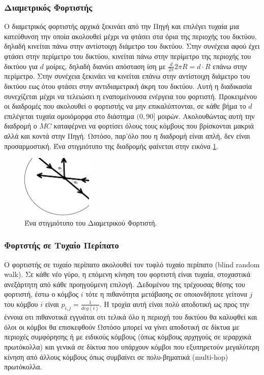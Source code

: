 \subsubsection{Διαμετρικός Φορτιστής}
Ο διαμετρικός φορτιστής αρχικά ξεκινάει από την Πηγή και επιλέγει τυχαία μια κατεύθυνση την οποία ακολουθεί μέχρι να φτάσει στα όρια της περιοχής του δικτύου, δηλαδή
κινείται πάνω στην αντίστοιχη διάμετρο του δικτύου. Στην συνέχεια αφού έχει φτάσει στην περίμετρο του δικτύου, κινείται πάνω στην περίμετρο της περιοχής του δικτύου
για $d$ μοίρες, δηλαδή διανύει απόσταση ίση με $\frac{d}{2\pi}2\pi R = d\cdot R$ επάνω στην περίμετρο. Στην συνέχεια ξεκινάει να κινείται επάνω στην αντίστοιχη
διάμετρο του δικτύου εως ότου φτάσει στην αντιδιαμετρική άκρη του δικτύου. Αυτή η διαδικασία συνεχίζεται μέχρι να τελειώσει η εναπομείνουσα ενέργεια του φορτιστή.
Προκειμένου οι διαδρομές που ακολουθεί ο φορτιστής να μην επικαλύπτονται, σε κάθε βήμα το $d$ επιλέγεται τυχαία ομοιόμορφα στο διάστημα $(0,90]$ μοιρών. Ακολουθώντας
αυτή την διαδρομή ο $MC$ καταφέρνει να φορτίσει όλους τους κόμβους που βρίσκονται μακριά αλλά και κοντά στην Πηγή. Ωστόσο, παρ'όλο που η διαδρομή είναι απλή, δεν
είναι προσαρμοστική. Ένα στιγμιότυπο της διαδρομής φαίνεται στην εικόνα \ref{fig:diameter_charger}.
\vspace{0.9cm}
\begin{figure}[h]
	\centering
	\includegraphics[width=0.3\textwidth]{images/diameter.eps}
	\caption{Ένα στιγμιότυπο του Διαμετρικού Φορτιστή.}
	\label{fig:diameter_charger}
\end{figure}


\subsubsection{Φορτστής σε Τυχαίο Περίπατο}
Ο φορτιστής σε τυχαίο περίπατο ακολουθεί τον τυφλό τυχαίο περίπατο (blind random walk). Σε κάθε νέο γύρο, η επόμενη κίνηση του φορτιστή είναι τυχαία, στοχαστικά
ανεξάρτητη από κάθε προηγούμενη επιλογή. Δεδομένου της τρέχουσας θέσης του φορτιστή, έστω ο κόμβος $i$ τότε η πιθανότητα μετάβασης σε οποιονδήποτε γείτονα $j$ του
κόμβου $i$ είναι $p_{i,j} =\frac{1}{deg(i)}$. Η τροχία αυτή είναι πολύ αποδοτική ως προς την έννοια οτι πιθανοτικά εγγυάται οτι τελικά όλο η περιοχή του δικτύου θα
καλυφθεί και όλοι οι κόμβοι θα επισκεφθούν Ωστόσο μπορεί να γίνει αποδοτική σε δίκτυα με περιοχές συμφόρησης ή με ειδικούς κόμβους (όπως κόμβους αρχηγούς σε
ιεραρχικά πρωτόκολλα) και γενικά σε δίκτυα που υπάρχουν κόμβοι που εξυπηρετούν μεγαλύτερη κίνηση από άλλους κόμβους όπως συμβαίνει σε πολυ-βηματικά (multi-hop)
πρωτόκολλα.

